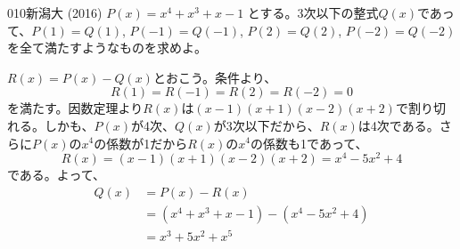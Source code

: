 \begin{prob}{010}{}{新潟大 (2016)}
 $P(x)=x^4+x^3+x-1$ とする。3次以下の整式$Q(x)$であって、$P(1)=Q(1)$, $P(-1)=Q(-1)$, $P(2)=Q(2)$, $P(-2)=Q(-2)$ を全て満たすようなものを求めよ。
\end{prob}
$R(x)=P(x)-Q(x)$とおこう。条件より、
\[ R(1)=R(-1)=R(2)=R(-2)=0 \]
を満たす。因数定理より$R(x)$は$(x-1)(x+1)(x-2)(x+2)$で割り切れる。しかも、$P(x)$が4次、$Q(x)$が3次以下だから、$R(x)$は4次である。さらに$P(x)$の$x^4$の係数が1だから$R(x)$の$x^4$の係数も1であって、
\[ R(x)=(x-1)(x+1)(x-2)(x+2)=x^4-5x^2+4 \]
である。よって、
\begin{align*}
 Q(x)&=P(x)-R(x) \\
&=(x^4+x^3+x-1)-(x^4-5x^2+4) \\
&= x^3+5x^2+x^5
\end{align*}